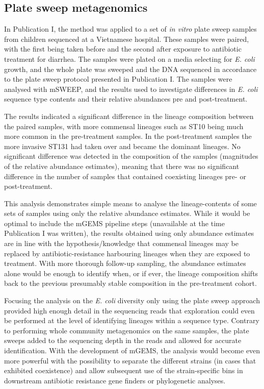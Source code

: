 \documentclass[officiallayout]{tktla}
\begin{document}
\subsection{Plate sweep metagenomics}

In Publication I, the method was applied to a set of \textit{in vitro}
plate sweep samples from children sequenced at a Vietnamese
hospital. These samples were paired, with the first being taken before
and the second after exposure to antibiotic treatment for
diarrhea. The samples were plated on a media selecting for
\textit{E. coli} growth, and the whole plate was sweeped and the DNA
sequenced in accordance to the plate sweep protocol presented in
Publication I. The samples were analysed with mSWEEP, and the results
used to investigate differences in \textit{E. coli} sequence type
contents and their relative abundances pre and post-treatment.

The results indicated a significant difference in the lineage
composition between the paired samples, with more commensal lineages
such as ST10 \citep{maklin_strong_2022} being much more common in the
pre-treatment samples. In the post-treatment samples the more invasive
ST131 \citep{maklin_strong_2022} had taken over and became the
dominant lineages. No significant difference was detected in the
composition of the samples (magnitudes of the relative abundance
estimates), meaning that there was no significant difference in the
number of samples that contained coexisting lineages pre- or
post-treatment.

This analysis demonstrates simple means to analyse the
lineage-contents of some sets of samples using only the relative
abundance estimates. While it would be optimal to include the mGEMS
pipeline steps (unavailable at the time Publication I was written), the
results obtained using only abundance estimates are in line with the
hypothesis/knowledge that commensal lineages may be replaced by
antibiotic-resistance harbouring lineages when they are exposed to
treatment. With more thorough follow-up sampling, the abundance
estimates alone would be enough to identify when, or if ever, the
lineage composition shifts back to the previous presumably stable
composition in the pre-treatment cohort.

Focusing the analysis on the \textit{E. coli} diversity only using the
plate sweep approach provided high enough detail in the sequencing
reads that exploration could even be performed at the level of identifying lineages within a sequence type. Contrary to
performing whole community metagenomics on the same samples, the plate sweeps
added to the sequencing depth in the reads and allowed for accurate
identification. With the development of mGEMS, the
analysis would become even more powerful with the possibility to
separate the different strains (in cases that exhibited coexistence)
and allow subsequent use of the strain-specific bins in downstream
antibiotic resistance gene finders or phylogenetic analyses.
\end{document}
